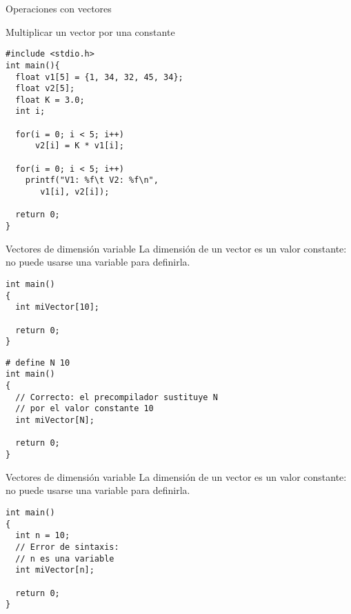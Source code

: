 \documentclass[xcolor={usenames,svgnames,dvipsnames}, aspectratio=169]{beamer}
\begin{document}
\begin{frame}[label={sec:orgb2550fe},fragile]{Operaciones con vectores}
 \begin{block}{Multiplicar un vector por una constante}
\lstset{language=C,label= ,caption= ,captionpos=b,numbers=none}
\begin{lstlisting}
#include <stdio.h> 
int main(){
  float v1[5] = {1, 34, 32, 45, 34};
  float v2[5];
  float K = 3.0;
  int i;
  
  for(i = 0; i < 5; i++)
      v2[i] = K * v1[i];

  for(i = 0; i < 5; i++)
    printf("V1: %f\t V2: %f\n",
	   v1[i], v2[i]);

  return 0;
}
\end{lstlisting}
\end{block}
\end{frame}


\begin{frame}[label={sec:org9f7a438},fragile]{Vectores de dimensión variable}
 La dimensión de un vector es un valor constante: \alert{no puede usarse una variable} para definirla.

\lstset{language=C,label= ,caption= ,captionpos=b,numbers=none}
\begin{lstlisting}
int main()
{
  int miVector[10];

  return 0;
}
\end{lstlisting}

\lstset{language=C,label= ,caption= ,captionpos=b,numbers=none}
\begin{lstlisting}
# define N 10
int main()
{
  // Correcto: el precompilador sustituye N
  // por el valor constante 10
  int miVector[N];

  return 0;
}
\end{lstlisting}
\end{frame}

\begin{frame}[label={sec:org66be14e},fragile]{Vectores de dimensión variable}
 La dimensión de un vector es un valor constante: \alert{no puede usarse una variable} para definirla.

\lstset{language=C,label= ,caption= ,captionpos=b,numbers=none}
\begin{lstlisting}
int main()
{
  int n = 10;
  // Error de sintaxis:
  // n es una variable
  int miVector[n];

  return 0;
}
\end{lstlisting}
\end{frame}
\end{document}
